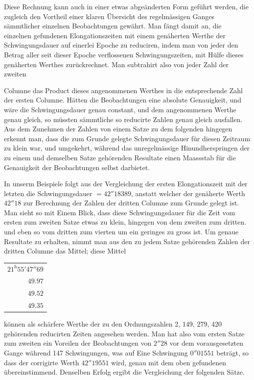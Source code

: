 Diese Rechnung kann auch in einer etwas abgeänderten Form geführt werden, die zugleich den Vortheil einer klaren Übersicht des regelmässigen Ganges sämmtlicher einzelnen Beobachtungen gewährt. Man fängt damit an, die einzelnen gefundenen Elongationszeiten mit einem genäherten Werthe der Schwingungsdauer auf einerlei Epoche zu reduciren, indem man von jeder den Betrag aller seit dieser Epoche verflossenen Schwingungszeiten, mit Hülfe dieses genäherten Werthes zurückrechnet. Man subtrahirt also von jeder Zahl der zweiten
\par\clearpage
{}
\noindent Columne das Product dieses angenommenen Werthes in die entsprechende Zahl der ersten Columne. Hätten die Beobachtungen eine absolute Genauig\-keit, und wäre die Schwingungsdauer genau constant, und dem angenommenen Werthe genau gleich, so müssten sämmtliche so reducirte Zahlen genau gleich ausfallen. Aus dem Zunehmen der Zahlen von einem Satze zu dem folgenden hingegen erkennt man, dass die zum Grunde gelegte Schwingungsdauer für diesen Zeitraum zu klein war, und umgekehrt, während das unregelmässige Hinundherspringen der zu einem und demselben Satze gehörenden Resultate einen Maassstab für die Genauigkeit der Beobachtungen selbst darbietet.

In unserm Beispiele folgt aus der Vergleichung der ersten Elongationszeit mit der letzten die Schwingungsdauer $=42''18389$, anstatt welcher der genäherte Werth $42''18$ zur Berechnung der Zahlen der dritten Columne zum Grunde gelegt ist. Man sieht so mit Einem Blick, dass diese Schwingungsdauer für die Zeit vom ersten zum zweiten Satze etwas zu klein, hingegen von dem zweiten zum dritten. und eben so vom dritten zum vierten um ein geringes zu gross ist. Um genaue Resultate zu erhalten, nimmt man aus den zu jedem Satze gehörenden Zahlen der dritten Columne das Mittel; diese Mittel
\begin{center}
\begin{tabular}{r}
$21^{\mathrm{h}}55'47''69$\\
$49.97$\\
$49.52$\\
$49.35$
\end{tabular}
\end{center}
können als schärfere Werthe der zu den Ordnungszahlen 2, 149, 279, 420 gehörenden reducirten Zeiten angesehen werden. Man hat also vom ersten Satze zum zweiten ein Voreilen der Beobachtungen von $2''28$ vor dem vorausgesetzten Gange während 147 Schwingungen, was auf Eine Schwingung $0''01551$ beträgt, so dass der corrigirte Werth $42''19551$ wird, genau mit dem oben gefundenen übereinstimmend. Denselben Erfolg ergibt die Vergleichung der folgenden Sätze.

